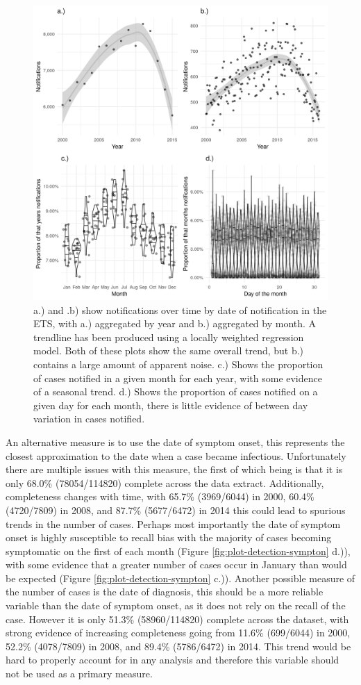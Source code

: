\documentclass[11pt,twoside]{bristolthesis}
\begin{document}
  \begin{figure}
  
  {\centering \includegraphics[width=0.8\linewidth]{chapters/tb-epi-england/figures/plot-detection-not} 
  
  }
  
  \caption{a.) and .b) show notifications over time by date of notification in the ETS, with a.) aggregated by year and  b.) aggregated by month. A trendline has been produced using a locally weighted regression model. Both of these plots show the same overall trend, but b.) contains a large amount of apparent noise. c.) Shows the proportion of cases notified in a given month for each year, with some evidence of a seasonal trend. d.) Shows the proportion of cases notified on a given day for each month, there is little evidence of between day variation in cases notified.}\label{fig:plot-detection-not}
  \end{figure}
  An alternative measure is to use the date of symptom onset, this represents the closest approximation to the date when a case became infectious. Unfortunately there are multiple issues with this measure, the first of which being is that it is only 68.0\% (78054/114820) complete across the data extract. Additionally, completeness changes with time, with 65.7\% (3969/6044) in 2000, 60.4\% (4720/7809) in 2008, and 87.7\% (5677/6472) in 2014 this could lead to spurious trends in the number of cases. Perhaps most importantly the date of symptom onset is highly susceptible to recall bias with the majority of cases becoming symptomatic on the first of each month (Figure \ref{fig:plot-detection-sympton} d.)), with some evidence that a greater number of cases occur in January than would be expected (Figure \ref{fig:plot-detection-sympton} c.)). Another possible measure of the number of cases is the date of diagnosis, this should be a more reliable variable than the date of symptom onset, as it does not rely on the recall of the case. However it is only 51.3\% (58960/114820) complete across the dataset, with strong evidence of increasing completeness going from 11.6\% (699/6044) in 2000, 52.2\% (4078/7809) in 2008, and 89.4\% (5786/6472) in 2014. This trend would be hard to properly account for in any analysis and therefore this variable should not be used as a primary measure.
\end{document}
